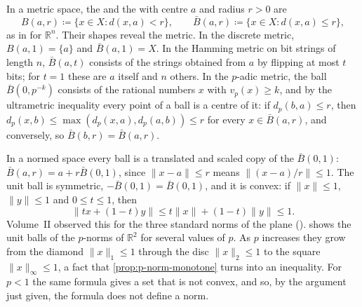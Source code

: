 In a metric space, the  and the  with centre $a$ and radius $r>0$ are
\[
B(a,r)\coloneqq\{x\in X: d(x,a)<r\},\qquad\bar B(a,r)\coloneqq\{x\in X: d(x,a)\le r\},
\]
as in  for $\mathbb R^n$. Their shapes reveal the metric. In the discrete metric, $B(a,1)=\{a\}$ and $\bar B(a,1)=X$. In the Hamming metric on bit strings of length $n$, $\bar B(a,t)$ consists of the strings obtained from $a$ by flipping at most $t$ bits; for $t=1$ these are $a$ itself and $n$ others. In the $p$-adic metric, the ball $\bar B(0,p^{-k})$ consists of the rational numbers $x$ with $v_p(x)\ge k$, and by the ultrametric inequality every point of a ball is a centre of it: if $d_p(b,a)\le r$, then $d_p(x,b)\le\max(d_p(x,a),d_p(a,b))\le r$ for every $x\in\bar B(a,r)$, and conversely, so $\bar B(b,r)=\bar B(a,r)$.

In a normed space every ball is a translated and scaled copy of the  $\bar B(0,1)$: $\bar B(a,r)=a+r\bar B(0,1)$, since $\|x-a\|\le r$ means $\|(x-a)/r\|\le1$. The unit ball is symmetric, $-\bar B(0,1)=\bar B(0,1)$, and it is convex: if $\|x\|\le1$, $\|y\|\le1$ and $0\le t\le1$, then
\[
\|tx+(1-t)y\|\le t\|x\|+(1-t)\|y\|\le1 .
\]
Volume~II observed this for the three standard norms of the plane ().  shows the unit balls of the $p$-norms of $\mathbb R^2$ for several values of $p$. As $p$ increases they grow from the diamond $\|x\|_1\le1$ through the disc $\|x\|_2\le1$ to the square $\|x\|_\infty\le1$, a fact that \cref{prop:p-norm-monotone} turns into an inequality. For $p<1$ the same formula gives a set that is not convex, and so, by the argument just given, the formula does not define a norm.

